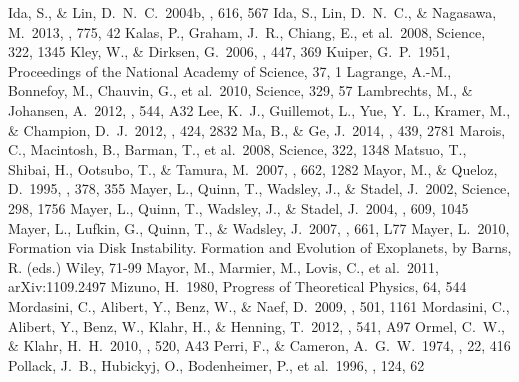 \documentclass[twocolumn, dvipdfmx]{aastex62}
\begin{document}
\begin{CJK*}{UTF8}{min}
\begin{thebibliography}{}
 Ida, S., \& Lin, D.~N.~C.\ 2004b, \apj, 616, 567
 Ida, S., Lin, D.~N.~C., \& Nagasawa, M.\ 2013, \apj, 775, 42
 Kalas, P., Graham, J.~R., Chiang, E., et al.\ 2008, Science, 322, 1345
 Kley, W., \& Dirksen, G.\ 2006, \aap, 447, 369
 Kuiper, G.~P.\ 1951, Proceedings of the National Academy of Science, 37, 1
 Lagrange, A.-M., Bonnefoy, M., Chauvin, G., et al.\ 2010, Science, 329, 57
 Lambrechts, M., \& Johansen, A.\ 2012, \aap, 544, A32
 Lee, K.~J., Guillemot, L., Yue, Y.~L., Kramer, M., \& Champion, D.~J.\ 2012, \mnras, 424, 2832
 Ma, B., \& Ge, J.\ 2014, \mnras, 439, 2781
 Marois, C., Macintosh, B., Barman, T., et al.\ 2008, Science, 322, 1348
 Matsuo, T., Shibai, H., Ootsubo, T., \& Tamura, M.\ 2007, \apj, 662, 1282
 Mayor, M., \& Queloz, D.\ 1995, \nat, 378, 355
 Mayer, L., Quinn, T., Wadsley, J., \& Stadel, J.\ 2002, Science, 298, 1756
 Mayer, L., Quinn, T., Wadsley, J., \& Stadel, J.\ 2004, \apj, 609, 1045
 Mayer, L., Lufkin, G., Quinn, T., \& Wadsley, J.\ 2007, \apjl, 661, L77
 Mayer, L.\ 2010, Formation via Disk Instability. Formation and Evolution of Exoplanets, by Barns, R. (eds.) Wiley, 71-99
 Mayor, M., Marmier, M., Lovis, C., et al.\ 2011, arXiv:1109.2497
 Mizuno, H.\ 1980, Progress of Theoretical Physics, 64, 544
 Mordasini, C., Alibert, Y., Benz, W., \& Naef, D.\ 2009, \aap, 501, 1161
 Mordasini, C., Alibert, Y., Benz, W., Klahr, H., \& Henning, T.\ 2012, \aap, 541, A97
 Ormel, C.~W., \& Klahr, H.~H.\ 2010, \aap, 520, A43
 Perri, F., \& Cameron, A.~G.~W.\ 1974, \icarus, 22, 416
 Pollack, J.~B., Hubickyj, O., Bodenheimer, P., et al.\ 1996, \icarus, 124, 62

\end{thebibliography}
\end{CJK*}
\end{document}
